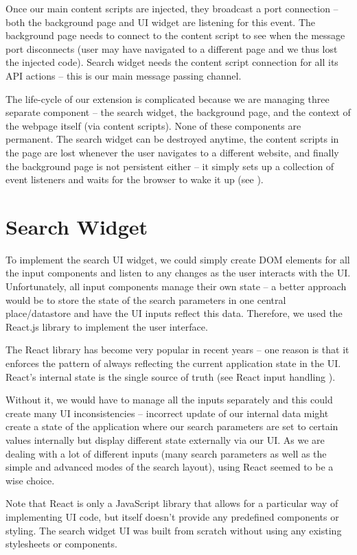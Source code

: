 \documentclass[bsc,frontabs,twoside,singlespacing,parskip,deptreport]{infthesis}
\begin{document}
Once our main content scripts are injected, they broadcast a port connection -- both the background page and UI widget are listening for this event. The background page needs to connect to the content script to see when the message port disconnects (user may have navigated to a different page and we thus lost the injected code). Search widget needs the content script connection for all its API actions -- this is our main message passing channel.

The life-cycle of our extension is complicated because we are managing three separate component -- the search widget, the background page, and the context of the webpage itself (via content scripts). None of these components are permanent. The search widget can be destroyed anytime, the content scripts in the page are lost whenever the user navigates to a different website, and finally the background page is not persistent either -- it simply sets up a collection of event listeners and waits for the browser to wake it up (see \cite{C6}).

\section{Search Widget}
To implement the search UI widget, we could simply create DOM elements for all the input components and listen to any changes as the user interacts with the UI. Unfortunately, all input components manage their own state -- a better approach would be to store the state of the search parameters in one central place/datastore and have the UI inputs reflect this data. Therefore, we used the React.js library to implement the user interface.

The React library \cite{A3} has become very popular in recent years -- one reason is that it enforces the pattern of always reflecting the current application state in the UI. React's internal state is the single source of truth (see React input handling \cite{A4}).

Without it, we would have to manage all the inputs separately and this could create many UI inconsistencies -- incorrect update of our internal data might create a state of the application where our search parameters are set to certain values internally but display different state externally via our UI. As we are dealing with a lot of different inputs (many search parameters as well as the simple and advanced modes of the search layout), using React seemed to be a wise choice.

Note that React is only a JavaScript library that allows for a particular way of implementing UI code, but itself doesn't provide any predefined components or styling. The search widget UI was built from scratch without using any existing stylesheets or components.
\end{document}
